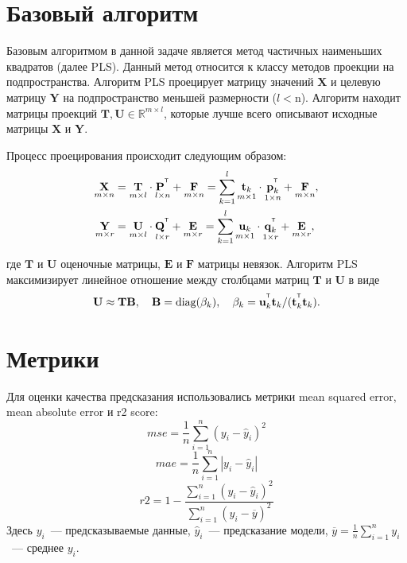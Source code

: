 \section{Базовый алгоритм}
Базовым алгоритмом в данной задаче является метод частичных наименьших квадратов (далее PLS).
Данный метод относится к классу методов проекции на подпространства. Алгоритм PLS проецирует матрицу значений $\mathbf{X}$ и целевую матрицу $\mathbf{Y}$ на подпространство меньшей размерности ($l < $n). Алгоритм находит матрицы проекций $\mathbf{T}, \mathbf{U} \in \mathbb{R}^{m \times l}$, которые лучше всего описывают исходные матрицы 
$\mathbf{X}$ и $\mathbf{Y}$.

Процесс проецирования происходит следующим образом:
\begin{align}
\label{eq:PLS_X}
\underset{m \times n}{\mathbf{X}} 
&= \underset{m \times l}{\mathbf{T}} \cdot \underset{l \times n}{\mathbf{P}^{\T}} + \underset{m \times n}{\mathbf{F}} 
= \sum_{k=1}^l \underset{m \times 1}{\mathbf{t}_k} \cdot \underset{1 \times n}{\mathbf{p}_k^{\T}} + \underset{m \times n}{\mathbf{F}},\\
\label{eq:PLS_Y}
\underset{m \times r}{\mathbf{Y}} 
&= \underset{m \times l}{\mathbf{U}} \cdot \underset{l \times r}{\mathbf{Q}^{\T}} + \underset{m \times r}{\mathbf{E}}
=  \sum_{k=1}^l  \underset{m \times 1}{\mathbf{u}_k} \cdot \underset{1 \times r}{\mathbf{q}_k^{\T}} +  \underset{m \times r}{\mathbf{E}},
\end{align}

где $\mathbf{T}$ и $\mathbf{U}$ оценочные матрицы, $\mathbf{E}$ и $\mathbf{F}$ матрицы невязок. Алгоритм PLS максимизирует линейное отношение 
между столбцами матриц $\mathbf{T}$ и $\mathbf{U}$ в виде
\begin{equation*}
\mathbf{U} \approx \mathbf{T} \mathbf{B}, \quad \mathbf{B} = \text{diag}(\beta_k), \quad \beta_k = \mathbf{u}^{^{\text{\tiny\sffamily\upshape\mdseries T}}}_k\mathbf{t}_k / (\mathbf{t}_k^{^{\text{\tiny\sffamily\upshape\mdseries T}}}\mathbf{t}_k).
\end{equation*} 

\section{Метрики}
Для оценки качества предсказания использовались метрики mean squared error, mean absolute error и r2 score:
\[
  mse = \frac1n \sum_{i = 1}^n (y_i - \hat{y}_i)^2 \]\[
  mae = \frac1n \sum_{i = 1}^n |y_i - \hat{y}_i| \]\[
  r2 = 1 - \frac{\sum_{i = 1}^n (y_i - \hat{y}_i)^2}{\sum_{i = 1}^n (y_i - \overline{y})^2}
\]
Здесь $y_i$~--- предсказываемые данные, $\hat{y}_i$~--- предсказание модели, $\overline{y} = \frac1n \sum_{i = 1}^n y_i$~--- среднее $y_i$.

